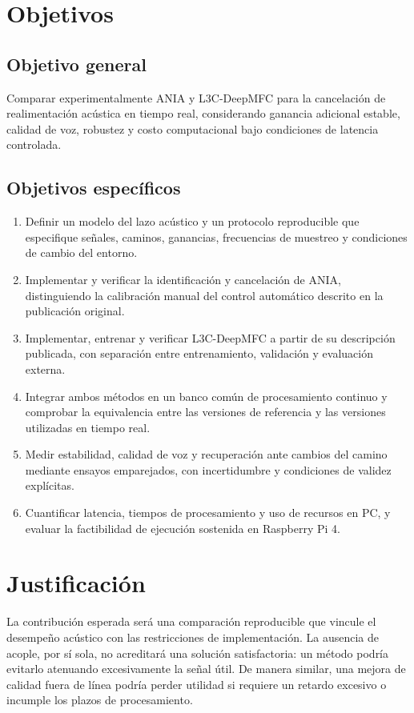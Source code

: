 \section{Objetivos}
\subsection{Objetivo general}
Comparar experimentalmente ANIA y L3C-DeepMFC para la cancelación de realimentación acústica en tiempo real, considerando ganancia adicional estable, calidad de voz, robustez y costo computacional bajo condiciones de latencia controlada.

\subsection{Objetivos específicos}
\begin{enumerate}
\item Definir un modelo del lazo acústico y un protocolo reproducible que especifique señales, caminos, ganancias, frecuencias de muestreo y condiciones de cambio del entorno.
\item Implementar y verificar la identificación y cancelación de ANIA, distinguiendo la calibración manual del control automático descrito en la publicación original.
\item Implementar, entrenar y verificar L3C-DeepMFC a partir de su descripción publicada, con separación entre entrenamiento, validación y evaluación externa.
\item Integrar ambos métodos en un banco común de procesamiento continuo y comprobar la equivalencia entre las versiones de referencia y las versiones utilizadas en tiempo real.
\item Medir estabilidad, calidad de voz y recuperación ante cambios del camino mediante ensayos emparejados, con incertidumbre y condiciones de validez explícitas.
\item Cuantificar latencia, tiempos de procesamiento y uso de recursos en PC, y evaluar la factibilidad de ejecución sostenida en Raspberry Pi 4.
\end{enumerate}

\section{Justificación}
La contribución esperada será una comparación reproducible que vincule el desempeño acústico con las restricciones de implementación. La ausencia de acople, por sí sola, no acreditará una solución satisfactoria: un método podría evitarlo atenuando excesivamente la señal útil. De manera similar, una mejora de calidad fuera de línea podría perder utilidad si requiere un retardo excesivo o incumple los plazos de procesamiento.

